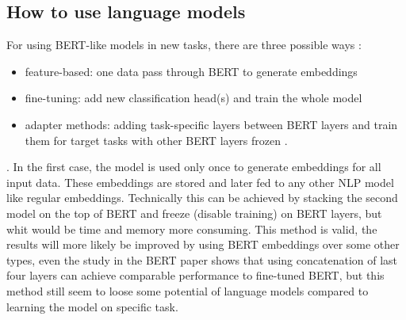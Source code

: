 \subsection{How to use language models}
 \label{sub:howto}

 For using BERT-like models in new tasks, there are three possible ways \citep{Liu2020}: 
 \begin{itemize}
 \item feature-based: one data pass through BERT to generate embeddings
 \item fine-tuning: add new classification head(s) and train the whole model
 \item adapter methods: adding task-specific layers between BERT layers and train them for target tasks with other BERT layers frozen \citep{Stickland2019}.
 \end{itemize}.
In the first case, the model is used only once to generate embeddings for all input data. These embeddings are stored and later fed to any other NLP model like regular embeddings. Technically this can be achieved by stacking the second model on the top of BERT and freeze (disable training) on BERT layers, but whit would be time and memory more consuming. This method is valid, the results will more likely be improved by using BERT embeddings over some other types, even the study in the BERT paper shows that using concatenation of last four layers can achieve comparable performance to fine-tuned BERT, but this method still seem to loose some potential of language models compared to learning the model on specific task.

 
